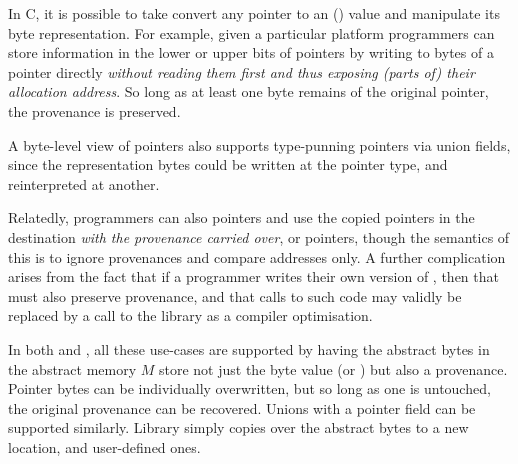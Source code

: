 In C, it is possible to take convert any pointer to an ()
 value and manipulate its byte representation. For example,
given a particular platform programmers can store information in the lower or upper bits of
pointers by writing to bytes of a pointer directly
\emph{without reading them first and thus exposing (parts of) their allocation
address}. So long as at least one byte remains of the original pointer, the
provenance is preserved.

A byte-level view of pointers also supports type-punning pointers via union
fields, since the representation bytes could be written at the pointer type,
and reinterpreted at another.

Relatedly, programmers can also  pointers and use the copied
pointers in the destination \emph{with the provenance carried over}, or
 pointers, though the semantics of this is to ignore
provenances and compare addresses only. A further complication arises from the
fact that if a programmer writes their own version of , then
that must also preserve provenance, and that calls to such code may validly be
replaced by a call to the library  as a compiler
optimisation.

In both  and , all these use-cases are supported by
having the abstract bytes in the abstract memory $M$ store not just the
byte value (or ) but also a provenance. Pointer bytes
can be individually overwritten, but so long as one is untouched, the original
provenance can be recovered. Unions with a pointer field can be supported
similarly. Library  simply copies over the abstract bytes to a
new location, and user-defined ones.

